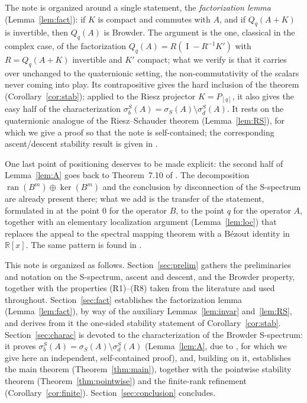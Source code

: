 \documentclass[11pt,a4paper]{article}
\theoremstyle{plain}
\theoremstyle{remark}
\newcommand{\RR}{\mathbb R}
\newcommand{\sS}{\sigma_S}
\newcommand{\sigb}{\sigma_b^S}
\newcommand{\sd}{\sigma_d^S}
\DeclareMathOperator{\ran}{ran}
\DeclareMathOperator{\Id}{I}
\newcommand{\Qq}[1]{Q_q(#1)}
\begin{document}
The note is organized around a single statement, the \emph{factorization lemma} (Lemma~\ref{lem:fact}): if $K$ is compact and commutes with $A$, and if $\Qq{A+K}$ is invertible, then $\Qq{A}$ is Browder. The argument is the one, classical in the complex case, of the factorization $\Qq{A}=R(\Id-R^{-1}K')$ with $R=\Qq{A+K}$ invertible and $K'$ compact; what we verify is that it carries over unchanged to the quaternionic setting, the non-commutativity of the scalars never coming into play. Its contrapositive gives the hard inclusion of the theorem (Corollary~\ref{cor:stab}); applied to the Riesz projector $K=P_{[q]}$, it also gives the easy half of the characterization $\sigb(A)=\sS(A)\setminus\sd(A)$. It rests on the quaternionic analogue of the Riesz--Schauder theorem (Lemma~\ref{lem:RS}), for which we give a proof so that the note is self-contained; the corresponding ascent/descent stability result is given in \cite[Thm~3.9]{KD24}.

One last point of positioning deserves to be made explicit: the second half of Lemma~\ref{lem:A} goes back to Theorem~7.10 of \cite{MT19}. The decomposition $\ran(B^m)\oplus\ker(B^m)$ and the conclusion by disconnection of the S-spectrum are already present there; what we add is the transfer of the statement, formulated in \cite{MT19} at the point $0$ for the operator $B$, to the point $q$ for the operator $A$, together with an elementary localization argument (Lemma~\ref{lem:loc}) that replaces the appeal to the spectral mapping theorem with a Bézout identity in $\RR[x]$. The same pattern is found in \cite[Thm~3.15]{AJ26}.

This note is organized as follows. Section~\ref{sec:prelim} gathers the preliminaries and notation on the S-spectrum, ascent and descent, and the Browder property, together with the properties (R1)--(R8) taken from the literature and used throughout. Section~\ref{sec:fact} establishes the factorization lemma (Lemma~\ref{lem:fact}), by way of the auxiliary Lemmas~\ref{lem:invar} and~\ref{lem:RS}, and derives from it the one-sided stability statement of Corollary~\ref{cor:stab}. Section~\ref{sec:charac} is devoted to the characterization of the Browder S-spectrum: it proves $\sigb(A)=\sS(A)\setminus\sd(A)$ (Lemma~\ref{lem:A}, due to \cite{AJ26}, for which we give here an independent, self-contained proof), and, building on it, establishes the main theorem (Theorem~\ref{thm:main}), together with the pointwise stability theorem (Theorem~\ref{thm:pointwise}) and the finite-rank refinement (Corollary~\ref{cor:finite}). Section~\ref{sec:conclusion} concludes.
\end{document}
